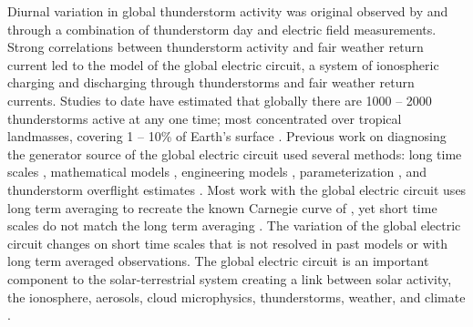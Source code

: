Diurnal variation in global thunderstorm activity was original observed by \citet{Wilson1921} and \citet{Whipple1929} through a combination of thunderstorm day and electric field measurements.
Strong correlations between thunderstorm activity and fair weather return current led to the model of the global electric circuit, a system of ionospheric charging and discharging through thunderstorms and fair weather return currents.
Studies to date have estimated that globally there are 1000 -- 2000 thunderstorms active at any one time; most concentrated over tropical landmasses, covering 1 -- 10\% of Earth's surface \citep{Markson1978, Rycroft2011a, Singh2011a}.
Previous work on diagnosing the generator source of the global electric circuit used several methods:  long time scales \citep{Tinsley2007, Liu2010}, mathematical models \citep{Kasemir1977, Hays1979, Roble1991}, engineering models \citep{Ogawa1985, Kartalev2004, Rycroft2006}, parameterization \citep{Price1992, Williams1985}, and thunderstorm overflight estimates \citep{Mach2011}.
Most work with the global electric circuit uses long term averaging to recreate the known Carnegie curve of \citet{Whipple1929}, yet short time scales do not match the long term averaging \citep{Holzworth1984a}.
The variation of the global electric circuit changes on short time scales that is not resolved in past models or with long term averaged observations.
The global electric circuit is an important component to the solar-terrestrial system creating a link between solar activity, the ionosphere, aerosols, cloud microphysics, thunderstorms, weather, and climate \citep{Tinsley2007, Holzworth1986}.

